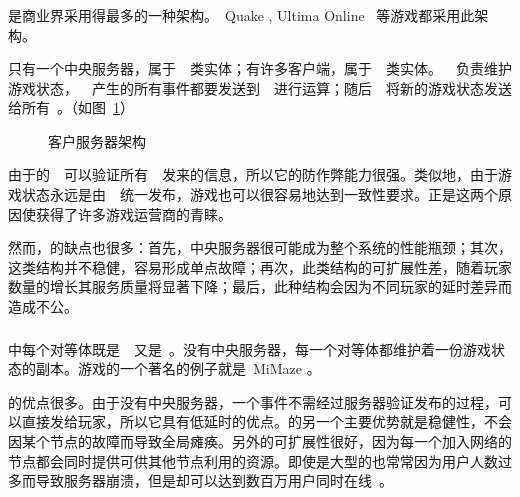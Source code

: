 \subsubsection{\csa} 

{\csa}是商业界采用得最多的一种架构。~Quake \cite{quake}, Ultima Online \cite{ultima}~等游戏都采用此架构。

{\csa}只有一个中央服务器，属于~\gss~类实体；有许多客户端，属于~\ioc~类实体。~\gss~负责维护游戏状态，~\ioc~产生的所有事件都要发送到~\gss~进行运算；随后~\gss~将新的游戏状态发送给所有~\ioc。（如图~\ref{CS}）

\begin{figure}[htbp]
\begin{center}
\caption{客户\/服务器架构}
\label{CS}
\end{center}
\end{figure}

由于{\csa}的~\gss~可以验证所有~\ioc~发来的信息，所以它的防作弊能力很强。类似地，由于游戏状态永远是由~\gss~统一发布，游戏也可以很容易地达到一致性要求。正是这两个原因使{\csa}获得了许多游戏运营商的青睐。

然而，{\csa}的缺点也很多：首先，中央服务器很可能成为整个系统的性能瓶颈；其次，这类结构并不稳健，容易形成单点故障；再次，此类结构的可扩展性差，随着玩家数量的增长其服务质量将显著下降；最后，此种结构会因为不同玩家的延时差异而造成不公。

\subsubsection{\pa}

{\pa}中每个对等体既是~\ioc~又是~\gss。没有中央服务器，每一个对等体都维护着一份游戏状态的副本。{\pa}游戏的一个著名的例子就是~MiMaze \cite{mimaze}。

{\pa}的优点很多。由于没有中央服务器，一个事件不需经过服务器验证发布的过程，可以直接发给玩家，所以它具有低延时的优点。{\pa}的另一个主要优势就是稳健性，不会因某个节点的故障而导致全局瘫痪。另外{\pa}的可扩展性很好，因为每一个加入网络的节点都会同时提供可供其他节点利用的资源。即使是大型的{\csa}也常常因为用户人数过多而导致服务器崩溃，但是{\pa}却可以达到数百万用户同时在线~\cite{real}。

